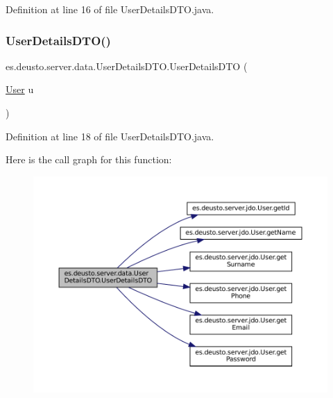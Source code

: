 Definition at line 16 of file User\+Details\+D\+T\+O.\+java.

\mbox{\label{classes_1_1deusto_1_1server_1_1data_1_1_user_details_d_t_o_aae05e33019f1da5126c95feda9f7d25a}} 
\subsubsection{\texorpdfstring{UserDetailsDTO()}{UserDetailsDTO()}\hspace{0.1cm}{\footnotesize\ttfamily [2/2]}}
{\footnotesize\ttfamily es.\+deusto.\+server.\+data.\+User\+Details\+D\+T\+O.\+User\+Details\+D\+TO (\begin{DoxyParamCaption}\item[{\mbox{\hyperlink{classes_1_1deusto_1_1server_1_1jdo_1_1_user}{User}}}]{u }\end{DoxyParamCaption})}



Definition at line 18 of file User\+Details\+D\+T\+O.\+java.

Here is the call graph for this function\+:
\nopagebreak
\begin{figure}[H]
\begin{center}
\leavevmode
\includegraphics[width=350pt]{classes_1_1deusto_1_1server_1_1data_1_1_user_details_d_t_o_aae05e33019f1da5126c95feda9f7d25a_cgraph}
\end{center}
\end{figure}


